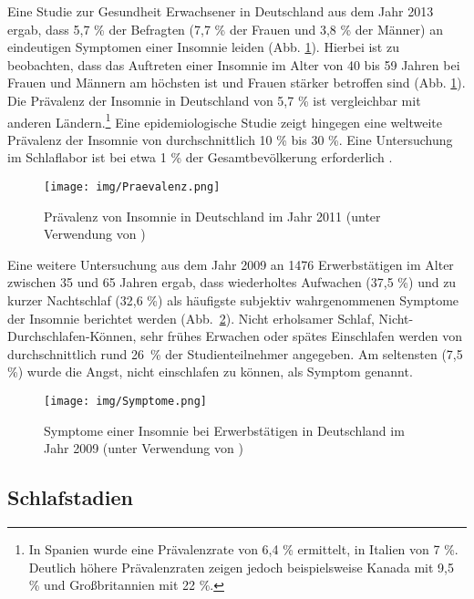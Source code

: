 Eine Studie zur Gesundheit Erwachsener in Deutschland aus dem Jahr 2013 ergab, dass 5,7 \% der Befragten (7,7 \% der Frauen und 3,8 \% der Männer) an eindeutigen Symptomen einer Insomnie leiden (Abb. \ref{fig:praevalenz}). Hierbei ist zu beobachten, dass das Auftreten einer Insomnie im Alter von 40 bis 59 Jahren bei Frauen und Männern am höchsten ist und Frauen stärker betroffen sind (Abb. \ref{fig:praevalenz}). Die Prävalenz der Insomnie in Deutschland von 5,7 \% ist vergleichbar mit anderen Ländern.\footnote{In Spanien wurde eine Prävalenzrate von 6,4 \% ermittelt, in Italien von 7 \%. Deutlich höhere Prävalenzraten zeigen jedoch beispielsweise Kanada mit 9,5 \% und Großbritannien mit 22 \%.} Eine epidemiologische Studie zeigt hingegen eine weltweite Prävalenz der Insomnie von durchschnittlich 10 \% bis 30 \%\parencite{ohayon_epidemiological_2011}. Eine Untersuchung im Schlaflabor ist bei etwa 1 \% der Gesamtbevölkerung erforderlich \parencite{penzel_schlafstorungen_2005}.
\parencite{schlack_haufigkeit_2013, robert_koch_institut_gesundheit_2015}

\begin{figure}[H]
	\centering
	\texttt{[image: img/Praevalenz.png]}
	\caption[Prävalenz von Insomnie]{Prävalenz von Insomnie in Deutschland im Jahr 2011 (unter Verwendung von \parencite{schlack_haufigkeit_2013})}
	\label{fig:praevalenz}
\end{figure}

Eine weitere Untersuchung aus dem Jahr 2009 an 1476 Erwerbstätigen im Alter zwischen 35 und 65 Jahren ergab, dass wiederholtes Aufwachen (37,5 \%) und zu kurzer Nachtschlaf (32,6 \%) als häufigste subjektiv wahrgenommenen Symptome der Insomnie berichtet werden (Abb.~\ref{fig:symptome}). Nicht erholsamer Schlaf, Nicht-Durchschlafen-Können, sehr frühes Erwachen oder spätes Einschlafen werden von durchschnittlich rund 26~\% der Studienteilnehmer angegeben. Am seltensten (7,5 \%) wurde die Angst, nicht einschlafen zu können, als Symptom genannt. \parencite{dak_forschung_gesundheitsreport_2010}

\begin{figure}[H]
	\centering
	\texttt{[image: img/Symptome.png]}
	\caption[Symptome der Insomnie]{Symptome einer Insomnie bei Erwerbstätigen in Deutschland im Jahr 2009 (unter Verwendung von \parencite{dak_forschung_gesundheitsreport_2010})}
	\label{fig:symptome}
\end{figure}

\subsection{Schlafstadien}\label{schlafstadien} 


